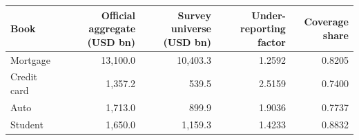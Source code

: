 \setlength{\tabcolsep}{4pt}
\begin{tabular}{lrrrr}
\toprule
Book & Official aggregate (USD bn) & Survey universe (USD bn) & Under-reporting factor & Coverage share \\
\midrule
Mortgage & 13,100.0 & 10,403.3 & 1.2592 & 0.8205 \\
Credit card & 1,357.2 & 539.5 & 2.5159 & 0.7400 \\
Auto & 1,713.0 & 899.9 & 1.9036 & 0.7737 \\
Student & 1,650.0 & 1,159.3 & 1.4233 & 0.8832 \\
\bottomrule
\end{tabular}
